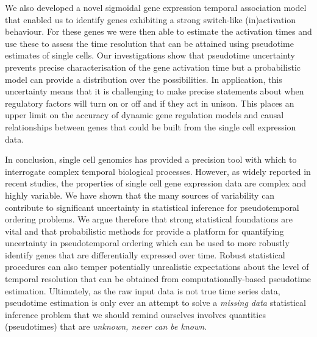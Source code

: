 We also developed a novel sigmoidal gene expression temporal association model that enabled us to identify genes exhibiting a strong switch-like (in)activation behaviour. For these genes we were then able to estimate the activation times and use these to assess the time resolution that can be attained using pseudotime estimates of single cells. Our investigations show that pseudotime uncertainty prevents precise characterisation of the gene activation time but a probabilistic model can provide a distribution over the possibilities. In application, this uncertainty means that it is challenging to make precise statements about when regulatory factors will turn on or off and if they act in unison. This places an upper limit on the accuracy of dynamic gene regulation models and causal relationships between genes that could be built from the single cell expression data.

In conclusion, single cell genomics has provided a precision tool with which to interrogate complex temporal biological processes. However, as widely reported in recent studies, the properties of single cell gene expression data are complex and highly variable. We have shown that the many sources of  variability can contribute to significant uncertainty in statistical inference for pseudotemporal ordering problems. We argue therefore that strong statistical foundations are vital and that probabilistic methods for provide a platform for quantifying uncertainty in pseudotemporal ordering which can be used to more robustly identify genes that are differentially expressed over time. Robust statistical procedures can also temper potentially unrealistic expectations about the level of temporal resolution that can be obtained from computationally-based pseudotime estimation. Ultimately, as the raw input data is not true time series data, pseudotime estimation is only ever an attempt to solve a \emph{missing data} statistical inference problem that we should remind ourselves involves quantities (pseudotimes) that are \emph{unknown, never can be known}.
